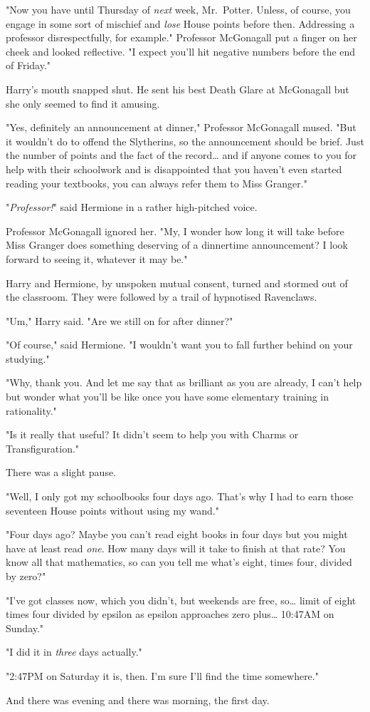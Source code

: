 "Now you have until Thursday of \emph{next} week, Mr.~Potter. Unless, of 
course, you engage in some sort of mischief and \emph{lose} House points before 
then. Addressing a professor disrespectfully, for example." Professor 
McGonagall put a finger on her cheek and looked reflective. "I expect you'll 
hit negative numbers before the end of Friday."

Harry's mouth snapped shut. He sent his best Death Glare at McGonagall but she 
only seemed to find it amusing.

"Yes, definitely an announcement at dinner," Professor McGonagall mused. "But 
it wouldn't do to offend the Slytherins, so the announcement should be brief. 
Just the number of points and the fact of the record{\ldots} and if anyone 
comes to you for help with their schoolwork and is disappointed that you 
haven't even started reading your textbooks, you can always refer them to Miss 
Granger."

"\emph{Professor!}" said Hermione in a rather high-pitched voice.

Professor McGonagall ignored her. "My, I wonder how long it will take before 
Miss Granger does something deserving of a dinnertime announcement? I look 
forward to seeing it, whatever it may be."

Harry and Hermione, by unspoken mutual consent, turned and stormed out of the 
classroom. They were followed by a trail of hypnotised Ravenclaws.

"Um," Harry said. "Are we still on for after dinner?"

"Of course," said Hermione. "I wouldn't want you to fall further behind on your 
studying."

"Why, thank you. And let me say that as brilliant as you are already, I can't 
help but wonder what you'll be like once you have some elementary training in 
rationality."

"Is it really that useful? It didn't seem to help you with Charms or 
Transfiguration."

There was a slight pause.

"Well, I only got my schoolbooks four days ago. That's why I had to earn those 
seventeen House points without using my wand."

"Four days ago? Maybe you can't read eight books in four days but you might 
have at least read \emph{one}. How many days will it take to finish at that 
rate? You know all that mathematics, so can you tell me what's eight, times 
four, divided by zero?"

"I've got classes now, which you didn't, but weekends are free, so{\ldots} 
limit of eight times four divided by epsilon as epsilon approaches zero 
plus{\ldots} 10:47AM on Sunday."

"I did it in \emph{three} days actually."

"2:47PM on Saturday it is, then. I'm sure I'll find the time somewhere."

And there was evening and there was morning, the first day.